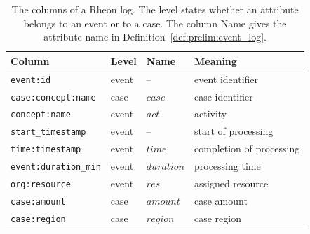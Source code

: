 \begin{table}[tb]
	\centering
	\caption[Schema of a Rheon log]{%
		The columns of a Rheon log. The level states whether an attribute belongs to an event or to a case. The column Name gives the attribute name in Definition~\ref{def:prelim:event_log}.}
	\label{tab:rheon:schema}
	\begin{tabular}{@{}lll>{\raggedright\arraybackslash}p{6.1cm}@{}}
		\toprule
		Column                       & Level &      Name                &           Meaning                                                 \\
		\midrule
		\texttt{event:id}            & event & --                  & event identifier      \\
		\texttt{case:concept:name}   & case  & $\mathit{case}$     & case identifier        \\
		\texttt{concept:name}        & event & $\mathit{act}$      & activity              \\
		\texttt{start\_timestamp}    & event & --                  & start of processing                                     \\
		\texttt{time:timestamp}      & event & $\mathit{time}$     & completion of processing                                \\
		\texttt{event:duration\_min} & event & $\mathit{duration}$ & processing time        \\
		\texttt{org:resource}        & event & $\mathit{res}$      & assigned resource   \\
		\texttt{case:amount}         & case  & $\mathit{amount}$   & case amount \\
		\texttt{case:region}         & case  & $\mathit{region}$   & case region         \\
		\bottomrule
	\end{tabular}
\end{table}

